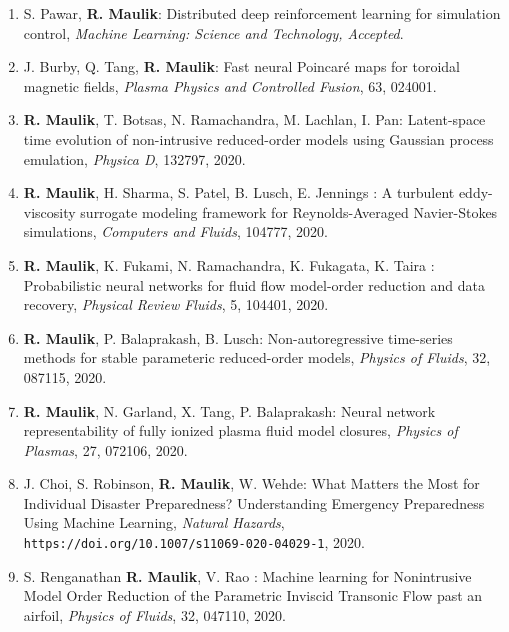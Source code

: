 \documentclass[letterpaper]{article}
\begin{document}
\begin{enumerate}

\item S. Pawar, \textbf{R. Maulik}: Distributed deep reinforcement learning for simulation control, {\it Machine Learning: Science and Technology, Accepted}.

\item J. Burby, Q. Tang, \textbf{R. Maulik}: Fast neural Poincar\'{e} maps for toroidal magnetic fields, {\it Plasma Physics and Controlled Fusion}, 63, 024001.

\item \textbf{R. Maulik}, T. Botsas, N. Ramachandra, M. Lachlan, I. Pan: Latent-space time evolution of non-intrusive reduced-order models using Gaussian process emulation, {\it Physica D}, 132797, 2020.

\item \textbf{R. Maulik}, H. Sharma, S. Patel, B. Lusch, E. Jennings : A turbulent eddy-viscosity surrogate modeling framework for Reynolds-Averaged Navier-Stokes simulations, {\it Computers and Fluids}, 104777, 2020.

\item \textbf{R. Maulik}, K. Fukami, N. Ramachandra, K. Fukagata, K. Taira : Probabilistic neural networks for fluid flow model-order reduction and data recovery, {\it Physical Review Fluids}, 5, 104401, 2020.

\item \textbf{R. Maulik}, P. Balaprakash, B. Lusch: Non-autoregressive time-series methods for stable parameteric reduced-order models, {\it Physics of Fluids}, 32, 087115, 2020.

\item \textbf{R. Maulik}, N. Garland, X. Tang, P. Balaprakash: Neural network representability of fully ionized plasma fluid model closures, {\it Physics of Plasmas}, 27, 072106, 2020.

\item J. Choi, S. Robinson, \textbf{R. Maulik}, W. Wehde: What Matters the Most for Individual Disaster Preparedness? Understanding Emergency Preparedness Using Machine Learning, {\it Natural Hazards}, \texttt{https://doi.org/10.1007/s11069-020-04029-1}, 2020.

\item S. Renganathan \textbf{R. Maulik}, V. Rao : Machine learning for Nonintrusive Model Order Reduction of the Parametric Inviscid Transonic Flow past an airfoil, {\it Physics of Fluids}, 32, 047110, 2020.


\end{enumerate}
\end{document}
